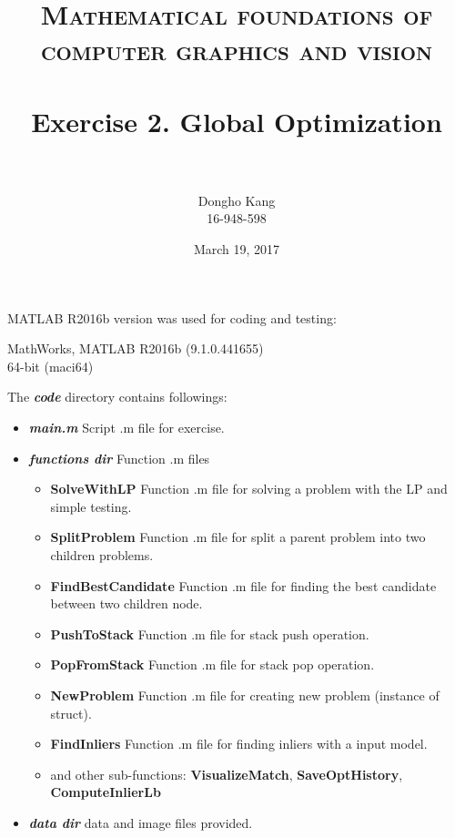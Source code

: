 \documentclass[paper=a4, fontsize=11pt]{scrartcl} %
\title{	
\normalfont \normalsize 
\textsc{Mathematical foundations of computer graphics and vision} \\ [25pt] %
\horrule{0.5pt} \\[0.4cm] %
\huge Exercise 2. Global Optimization \\ %
\horrule{2pt} \\[0.5cm] %
}
\author{Dongho Kang \\ \small 16-948-598} %
\date{\normalsize March 19, 2017} %
\numberwithin{equation}{section} %
\numberwithin{figure}{section} %
\numberwithin{table}{section} %
\newcommand{\filename}[1]{\textbf{\textit{#1}}}
\newcommand{\funcname}[1]{\textbf{#1}}
\begin{document}
\maketitle %


MATLAB R2016b version was used for coding and testing:

\begin{center}
MathWorks, MATLAB R2016b (9.1.0.441655) \\
64-bit (maci64) 
\end{center}

The \filename{code} directory contains followings:

\begin{itemize}
	\item \filename{main.m} \quad Script .m file for exercise.
	\item \filename{functions dir} \quad Function .m files 
		\begin{itemize}
			\item \funcname{SolveWithLP} \quad Function .m file for solving a problem with the LP and simple testing.
			\item \funcname{SplitProblem} \quad Function .m file for split a parent problem into two children problems.
			\item \funcname{FindBestCandidate} \quad Function .m file for finding the best candidate between two children node.
			\item \funcname{PushToStack} \quad Function .m file for stack push operation.
			\item \funcname{PopFromStack} \quad Function .m file for stack pop operation.
			\item \funcname{NewProblem} \quad Function .m file for creating new problem (instance of struct).    
			\item \funcname{FindInliers} \quad Function .m file for finding inliers with a input model.    
			\item and other sub-functions: \funcname{VisualizeMatch}, \funcname{SaveOptHistory}, \funcname{ComputeInlierLb}
		\end{itemize}
	\item \filename{data dir} \quad data and image files provided.
\end{itemize}
\end{document}
